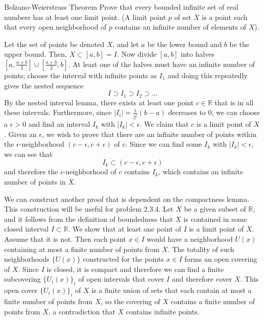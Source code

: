  \begin{exercise}{Bolzano-Weierstrass Theorem}
    Prove that every bounded infinite set of real numbers has at least one limit point. (A limit point $p$ of set $X$ is a point such that every open neighborhood of $p$ contains an infinite number of elements of $X$). 
  \end{exercise}
  \begin{solution}
    Let the set of points be denoted $X$, and let $a$ be the lower bound and $b$ be the upper bound. Then, $X \subset [a, b] = I$. Now divide $[a, b]$ into halves $[a, \frac{a + b}{2}] \cup [\frac{a + b}{2}, b]$. At least one of the halves must have an infinite number of points; choose the interval with infinite points as $I_1$ and doing this repeatedly gives the nested sequence 
    \begin{equation}
      I \supset I_1 \supset I_2 \supset \ldots
    \end{equation}
    By the nested interval lemma, there exists at least one point $c \in \mathbb{R}$ that is in all these intervals. Furthermore, since $|I_i| = \frac{1}{2^i} (b - a)$ decreases to $0$, we can choose a $\epsilon > 0$ and find an interval $I_k$ with $|I_k| < \epsilon$. We claim that $c$ is a limit point of $X$. Given an $\epsilon$, we wish to prove that there are an infinite number of points within the $\epsilon$-neighborhood $(c - \epsilon, c + \epsilon)$ of $c$. Since we can find some $I_k$ with $|I_k| < \epsilon$, we can see that 
    \begin{equation}
      I_k \subset (c - \epsilon, c + \epsilon)
    \end{equation}
    and therefore the $\epsilon$-neighborhood of $c$ contains $I_k$, which contains an infinite number of points in $X$. 
  \end{solution}
  \begin{solution}
    We can construct another proof that is dependent on the compactness lemma. This construction will be useful for problem 2.3.4. Let $X$ be a given subset of $\mathbb{R}$, and it follows from the definition of boundedness that $X$ is contained in some closed interval $I \subset \mathbb{R}$. We show that at least one point of $I$ is a limit point of $X$. Assume that it is not. Then each point $x \in I$ would have a neighborhood $U(x)$ containing at most a finite number of points from $X$. The totality of such neighborhoods $\{U(x)\}$ constructed for the points $x \in I$ forms an open covering of $X$. Since $I$ is closed, it is compact and therefore we can find a finite subcovering $\{U_i(x)\}_{i}$ of open intervals that cover $I$ and therefore cover $X$. This open cover $\{U_i(x)\}_{i}$ of $X$ is a finite union of sets that each contain at most a finite number of points from $X$, so the covering of $X$ contains a finite number of points from $X$, a contradiction that $X$ contains infinite points. 
  \end{solution}


